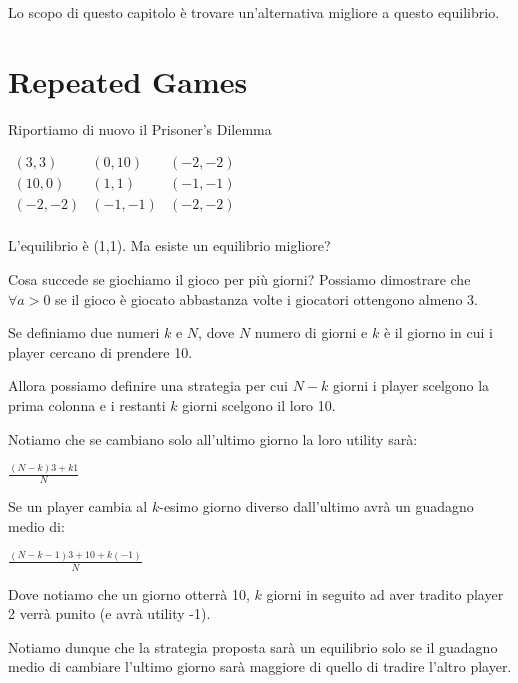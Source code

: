 \documentclass[10pt,a4paper]{report}
\begin{document}
        Lo scopo di questo capitolo è trovare un'alternativa migliore a questo equilibrio.

        \section{Repeated Games}

        Riportiamo di nuovo il Prisoner's Dilemma

        \begin{center}
            $
            \begin{matrix}
                (3,3) & (0,10) & (-2,-2)             \\
                (10,0) & (1,1) & (-1,-1)             \\
                (-2,-2) & (-1,-1) & (-2,-2)             \\
            \end{matrix}
            $    
        \end{center}
        
        L'equilibrio è (1,1). Ma esiste un equilibrio migliore?

        Cosa succede se giochiamo il gioco per più giorni? Possiamo dimostrare che $\forall a > 0$ se il gioco è giocato abbastanza volte i giocatori ottengono almeno 3.

        Se definiamo due numeri $k$ e $N$, dove $N$ numero di giorni e $k$ è il giorno in cui i player cercano di prendere 10.

        Allora possiamo definire una strategia per cui $N - k$ giorni i player scelgono la prima colonna e i restanti $k$ giorni scelgono il loro 10.

        Notiamo che se cambiano solo all'ultimo giorno la loro utility sarà:

        \begin{center}
            $\frac{(N-k)3 + k1}{N}$
        \end{center}

        Se un player cambia al $k$-esimo giorno diverso dall'ultimo avrà un guadagno medio di:
        \begin{center}
            $\frac{(N-k-1)3 + 10 + k(-1)}{N}$
        \end{center}

        Dove notiamo che un giorno otterrà 10, $k$ giorni in seguito ad aver tradito player 2 verrà punito (e avrà utility -1).

        Notiamo dunque che la strategia proposta sarà un equilibrio solo se il guadagno medio di cambiare l'ultimo giorno sarà maggiore di quello di tradire l'altro player.
\end{document}
